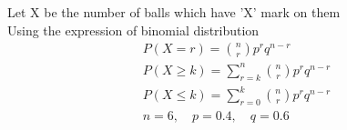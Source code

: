 Let X be the number of balls which have 'X' mark on them\\
Using the expression of binomial distribution
\begin{align}
    P(X = r) = {n \choose r} p^r q^{n-r}\\
    P(X \geq k) = \sum_{r = k}^n {n \choose r}p^r q^{n-r}\\
    P(X \leq k) = \sum_{r = 0}^k {n \choose r}p^r q^{n-r}\\
    n = 6,\quad p = 0.4,\quad q = 0.6
\end{align}
\begin{table}[!ht]
\caption{Probabilities of each case }    \label{tab:my_label}
\end{table}